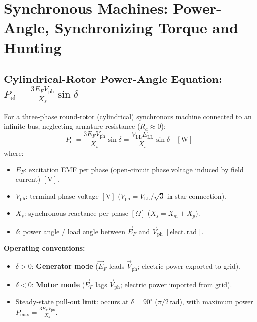 \section{Synchronous Machines: Power-Angle, Synchronizing Torque and Hunting}

\subsection{Cylindrical-Rotor Power-Angle Equation: \texorpdfstring{$P_{\mathrm{el}} = \frac{3 E_F V_{\mathrm{ph}}}{X_s}\sin\delta$}{Pel = (3 EF Vph / Xs) sin delta}}
For a three-phase round-rotor (cylindrical) synchronous machine connected to an infinite bus, neglecting armature resistance ($R_a \approx 0$):
\begin{equation}
\boxed{P_{\mathrm{el}} = \frac{3 E_F V_{\mathrm{ph}}}{X_s}\sin\delta = \frac{V_{\mathrm{LL}} E_{\mathrm{LL}}}{X_s}\sin\delta \quad [\mathrm{W}]}
\end{equation}
where:
\begin{itemize}
  \item $E_F$: excitation EMF per phase (open-circuit phase voltage induced by field current) $[\mathrm{V}]$.
  \item $V_{\mathrm{ph}}$: terminal phase voltage $[\mathrm{V}]$ ($V_{\mathrm{ph}} = V_{\mathrm{LL}}/\sqrt{3}$ in star connection).
  \item $X_s$: synchronous reactance per phase $[\Omega]$ ($X_s = X_m + X_p$).
  \item $\delta$: power angle / load angle between $\vec{E}_F$ and $\vec{V}_{\mathrm{ph}}$ $[\mathrm{elect.\,rad}]$.
\end{itemize}
\textbf{Operating conventions:}
\begin{itemize}
  \item $\delta > 0$: \textbf{Generator mode} ($\vec{E}_F$ leads $\vec{V}_{\mathrm{ph}}$; electric power exported to grid).
  \item $\delta < 0$: \textbf{Motor mode} ($\vec{E}_F$ lags $\vec{V}_{\mathrm{ph}}$; electric power imported from grid).
  \item Steady-state pull-out limit: occurs at $\delta = 90^\circ$ ($\pi/2\,\mathrm{rad}$), with maximum power $P_{\max} = \frac{3 E_F V_{\mathrm{ph}}}{X_s}$.
\end{itemize}

